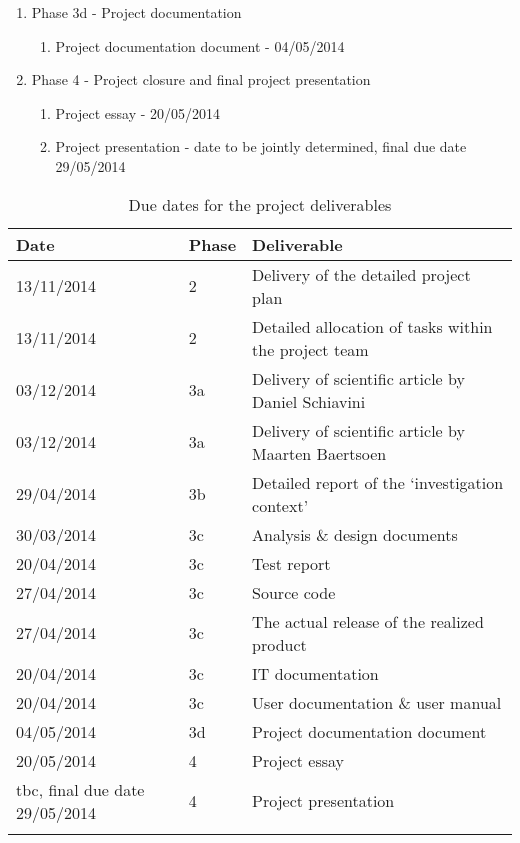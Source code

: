 \begin{enumerate}
 	\item Phase 3d - Project documentation
 	\begin{enumerate}
		\item Project documentation document				- 	04/05/2014
	\end {enumerate}
	\item Phase 4 - Project closure and final project presentation
 	\begin{enumerate}
		\item Project essay							- 	20/05/2014
		\item Project presentation						- 	date to be jointly determined, final due date 29/05/2014
	\end {enumerate}
\end {enumerate}

\begin{center}
    \begin{longtable}{ | p{3cm} | l |  p{7cm} |}
    \hline
    	\textbf{Date} & \textbf{Phase} & \textbf{Deliverable} \\ 
    	\endhead
    \hline
    	13/11/2014 & 2 & Delivery of the detailed project plan \\ 
    \hline
    	13/11/2014 & 2 & Detailed allocation of tasks within the project team \\ 
    \hline
    	03/12/2014 & 3a & Delivery of scientific article by Daniel Schiavini \\ 
    \hline
    	03/12/2014 & 3a & Delivery of scientific article by Maarten Baertsoen \\ 
    \hline
    	29/04/2014 & 3b & Detailed report of the `investigation context'  \\ 
    \hline
  	 30/03/2014 & 3c & Analysis \& design documents \\ 
    \hline
   	20/04/2014 & 3c & Test report \\ 
    \hline
  	27/04/2014 & 3c & Source code \\ 
    \hline
  	27/04/2014 & 3c & The actual release of the realized product \\ 
    \hline
  	20/04/2014 & 3c &  IT documentation   \\ 
    \hline
  	20/04/2014 & 3c & User documentation \& user manual  \\ 
    \hline
  	04/05/2014 & 3d & Project documentation document \\ 
    \hline
  	20/05/2014 & 4 & Project essay \\ 
    \hline
	\dict{TBC}{To be confirmed}%
 	tbc, final due date 29/05/2014 & 4 & Project presentation	 \\ 
    \hline
    \caption{Due dates for the project deliverables}
    \label{tab:deliverables}
    \end{longtable}
\end{center}

